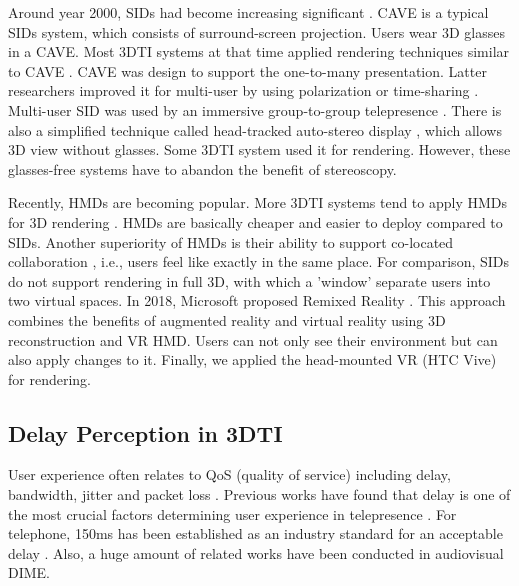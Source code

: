 Around year 2000, SIDs had become increasing significant \cite{gross2003blue}. CAVE \cite{cruz1993surround} is a typical SIDs system, which consists of surround-screen projection. Users wear 3D glasses in a CAVE. Most 3DTI systems at that time applied rendering techniques similar to CAVE \cite{gibbs1999teleport, towles20023d, gross2003blue, kurillo2008immersive, benko2012miragetable}. CAVE was design to support the one-to-many presentation. Latter researchers improved it for multi-user by using polarization or time-sharing \cite{frohlich2005implementing, kulik2011c1x6, guan2018two}. Multi-user SID was used by an immersive group-to-group telepresence \cite{beck2013immersive}. There is also a simplified technique called head-tracked auto-stereo display \cite{benko2014dyadic, jones2014roomalive}, which allows 3D view without glasses. Some 3DTI system \cite{maimone2011encumbrance, maimone2012real, pejsa2016room2room} used it for rendering. However, these glasses-free systems have to abandon the benefit of stereoscopy.

Recently, HMDs are becoming popular. More 3DTI systems tend to apply HMDs for 3D rendering \cite{orts2016holoportation, maimone2013general, lindlbauer2018remixed, smith2018communication}. HMDs are basically cheaper and easier to deploy compared to SIDs. Another superiority of HMDs is their ability to support co-located collaboration \cite{maimone2013general, orts2016holoportation}, i.e., users feel like exactly in the same place. For comparison, SIDs do not support rendering in full 3D, with which a 'window' separate users into two virtual spaces. In 2018, Microsoft proposed Remixed Reality \cite{lindlbauer2018remixed}. This approach combines the benefits of augmented reality and virtual reality using 3D reconstruction and VR HMD. Users can not only see their environment but can also apply changes to it. Finally, we applied the head-mounted VR (HTC Vive) for rendering.

\subsection{Delay Perception in 3DTI}

User experience often relates to QoS (quality of service) including delay, bandwidth, jitter and packet loss \cite{donovan2014understanding}. Previous works have found that delay is one of the most crucial factors determining user experience in telepresence \cite{vogel1995distributed, brunnstrom2013qualinet, schmitt2014asymmetric, schmitt2013qoe}. For telephone, 150ms has been established as an industry standard for an acceptable delay \cite{rec2003g, percy1999understanding}. Also, a huge amount of related works have been conducted in audiovisual DIME. 


